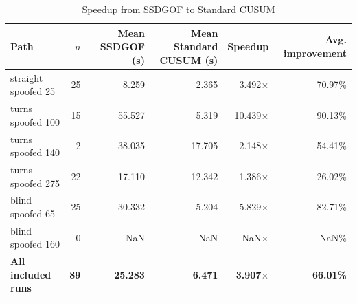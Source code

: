 \begin{table}[ht]
\centering
\caption{Speedup from SSDGOF to Standard CUSUM}
\label{tab:ssdgof_standard_cusum_speedup}
\begin{tabular}{lrrrrr}
\toprule
Path & $n$ & Mean SSDGOF (s) & Mean Standard CUSUM (s) & Speedup & Avg. improvement \\
\midrule
straight spoofed 25 & 25 & 8.259 & 2.365 & 3.492$\times$ & 70.97\% \\
turns spoofed 100 & 15 & 55.527 & 5.319 & 10.439$\times$ & 90.13\% \\
turns spoofed 140 & 2 & 38.035 & 17.705 & 2.148$\times$ & 54.41\% \\
turns spoofed 275 & 22 & 17.110 & 12.342 & 1.386$\times$ & 26.02\% \\
blind spoofed 65 & 25 & 30.332 & 5.204 & 5.829$\times$ & 82.71\% \\
blind spoofed 160 & 0 & NaN & NaN & NaN$\times$ & NaN\% \\
\midrule
\textbf{All included runs} & \textbf{89} & \textbf{25.283} & \textbf{6.471} & \textbf{3.907$\times$} & \textbf{66.01\%} \\
\bottomrule
\end{tabular}
\end{table}
